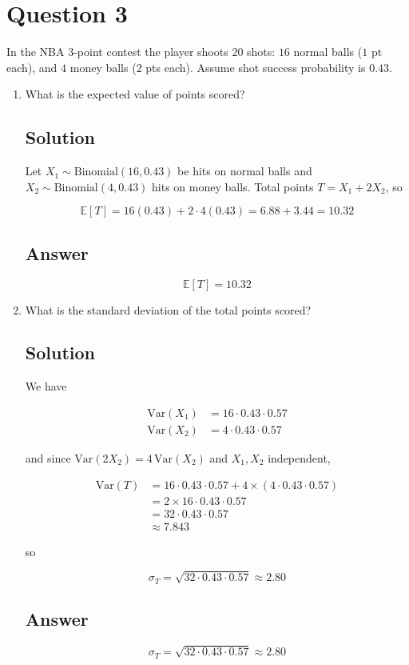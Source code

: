 \documentclass[12pt]{article}
\newcommand{\bE}{\mathbb{E}}
\begin{document}
	
	\section*{Question 3}
	
	\noindent In the NBA $3$-point contest the player shoots $20$ shots: $16$ normal balls ($1$ pt each), and $4$ money balls ($2$ pts each). Assume shot success probability is $0.43$.
	
	\bigskip
	
	\begin{enumerate}[start=1,label={\bfseries Part \arabic*:},leftmargin=0in]
		\bigskip\item What is the expected value of points scored?
		
		\subsection*{Solution}
		
			Let $X_1\sim\mathrm{Binomial}(16,0.43)$ be hits on normal balls and $X_2\sim\mathrm{Binomial}(4,0.43)$ hits on money balls. Total points $T = X_1 + 2X_2$, so
			
			\[
				\bE[T] = 16(0.43) + 2\cdot4(0.43) = 6.88 + 3.44 = 10.32
			\]
		
		\subsection*{Answer}
		
			\[\boxed{\bE[T] = 10.32}\]
		
		\bigskip\item What is the standard deviation of the total points scored?
		
		\subsection*{Solution}
		
			We have
			
			\[
				\begin{aligned}
					\mathrm{Var}(X_1)&=16\cdot0.43\cdot0.57\\
					\mathrm{Var}(X_2)&=4\cdot0.43\cdot0.57
				\end{aligned}
			\]
			
			and since $\mathrm{Var}(2X_2)=4\,\mathrm{Var}(X_2)$ and $X_1, X_2$ independent,
			
			\[
				\begin{aligned}
					\mathrm{Var}(T)
						&= 16\cdot0.43\cdot0.57 + 4\times(4\cdot0.43\cdot0.57)\\
						&= 2\times16\cdot0.43\cdot0.57\\
						&= 32\cdot0.43\cdot0.57\\
						&\approx7.843
				\end{aligned}
			\]
			
			so
			
			\[
				\sigma_T = \sqrt{32\cdot0.43\cdot0.57} \approx 2.80
			\]
		
		\subsection*{Answer}
		
			\[\boxed{\sigma_T = \sqrt{32\cdot0.43\cdot0.57}\approx2.80}\]
	\end{enumerate}
	
\end{document}
